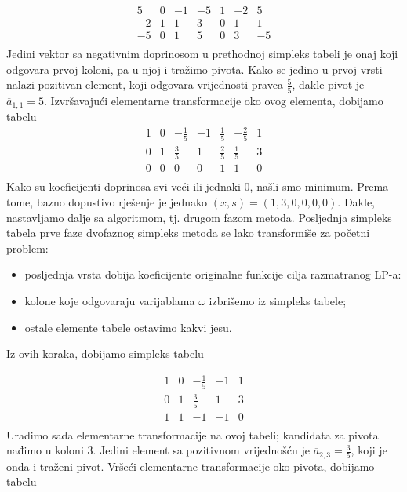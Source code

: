 \documentclass[a4paper, utf8, 11pt, colorlinks]{book}
\begin{document}
$$ \begin{array}{cccccc|c}
 	 5 & 0 & -1 & -5 & 1 & -2 & 5 \\
	-2&1  & 1 & 3 & 0 & 1 & 1 \\ \hline
	 -5 & 0 & 1 & 5 & 0 & 3 & -5 \\
 \end{array}
 $$
 Jedini vektor sa negativnim doprinosom u prethodnoj simpleks tabeli je 
 onaj koji odgovara prvoj koloni, pa u njoj i tražimo pivota.  
 Kako se jedino u prvoj vrsti nalazi pozitivan element, koji odgovara vrijednosti pravca $\frac{5}{5}$, dakle pivot je $\overline{a}_{1,1}=5$. Izvršavajući elementarne transformacije oko ovog elementa, dobijamo tabelu 
 $$ \begin{array}{cccccc|c}
        1 & 0 & -\frac{1}{5}  & -1   &  \frac{1}{5}     & -\frac{2}{5}  & 1                    \\
        0 & 1 & \frac{3}{5}   &  1   &   \frac{2}{5}  & \frac{1}{5}      & 3                   \\ \hline
        0 & 0 & 0            &  0   &   1        & 1                     & 0                                 \\
    \end{array}
$$
Kako su koeficijenti doprinosa svi veći ili jednaki 0, našli smo minimum. 
Prema tome, bazno dopustivo rješenje je jednako $(x, s)= (1,3, 0, 0, 0, 0)$. Dakle, nastavljamo dalje sa algoritmom, tj. drugom fazom metoda.  Posljednja simpleks tabela prve faze dvofaznog simpleks metoda se lako transformiše za početni problem: 
\begin{itemize}
	\item posljednja vrsta dobija koeficijente originalne funkcije cilja razmatranog LP-a:
	\item kolone koje odgovaraju varijablama $\omega$ izbrišemo iz simpleks tabele;
	\item ostale elemente tabele ostavimo kakvi jesu.
\end{itemize}
Iz ovih koraka, dobijamo simpleks tabelu 

 $$ \begin{array}{cccc|c}
 	   1 & 0 & -\frac{1}{5}     & -1   & 1 \\
 	   0 & 1 & \frac{3}{5}      & 1    & 3 \\ \hline
       1 & 1 & -1               & -1   & 0 \\
    \end{array}
$$
Uradimo sada elementarne transformacije na ovoj tabeli; kandidata za pivota nađimo u 
koloni 3. Jedini element sa pozitivnom vrijednošću je $\overline{a}_{2,3} = \frac{3}{5}$, koji je onda i traženi pivot. 
Vršeći elementarne transformacije oko pivota, dobijamo tabelu 
\end{document}
